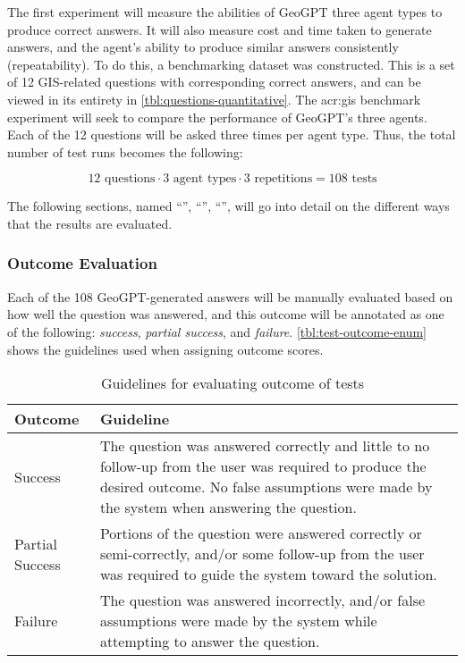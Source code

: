 The first experiment will measure the abilities of GeoGPT three agent types to produce correct answers. It will also measure cost and time taken to generate answers, and the agent's ability to produce similar answers consistently (repeatability). To do this, a benchmarking dataset was constructed. This is a set of 12 GIS-related questions with corresponding correct answers, and can be viewed in its entirety in \autoref{tbl:questions-quantitative}. The \acrshort{acr:gis} benchmark experiment will seek to compare the performance of GeoGPT's three agents. Each of the 12 questions will be asked three times per agent type. Thus, the total number of test runs becomes the following:

$$12 \text{ questions} \cdot 3 \text{ agent types} \cdot 3 \text{ repetitions} = 108 \text{ tests}$$

The following sections, named \enquote{}, \enquote{}, \enquote{}, will go into detail on the different ways that the results are evaluated.

\subsubsection{Outcome Evaluation}
\label{subsubsec:outcome-evaluation}

Each of the 108 GeoGPT-generated answers will be manually evaluated based on how well the question was answered, and this outcome will be annotated as one of the following: \textit{success}, \textit{partial success}, and \textit{failure}. \autoref{tbl:test-outcome-enum} shows the guidelines used when assigning outcome scores.

\begin{table}[htbp]
    \centering
    \caption[Guidelines for evaluating outcome of tests]{Guidelines for evaluating outcome of tests}
    \label{tbl:test-outcome-enum}
    \begin{tabularx}{0.9\textwidth}{p{3cm}X}
        \toprule
        \textbf{Outcome} & \textbf{Guideline}                                                                                                                                                                                  \\
        \midrule
        Success          & The question was answered correctly and little to no follow-up from the user was required to produce the desired outcome. No false assumptions were made by the system when answering the question. \\
        Partial Success  & Portions of the question were answered correctly or semi-correctly, and/or some follow-up from the user was required to guide the system toward the solution.                                       \\
        Failure          & The question was answered incorrectly, and/or false assumptions were made by the system while attempting to answer the question.                                                                    \\
        \bottomrule
    \end{tabularx}
\end{table}


